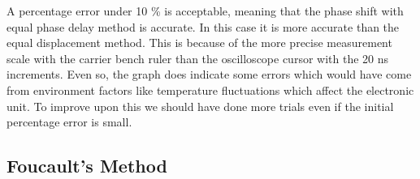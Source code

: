 \documentclass[12pt]{article}
\begin{document}
	A percentage error under 10 \% is acceptable, meaning that the phase shift with equal phase delay method is accurate. In this case it is more accurate than the equal displacement method. This is because of the more precise measurement scale with the carrier bench ruler than the oscilloscope cursor with the 20 ns increments. Even so, the graph does indicate some errors which would have come from environment factors like temperature fluctuations which affect the electronic unit. To improve upon this we should have done more trials even if the initial percentage error is small.
	
	
	\subsection{Foucault's Method}
	
\end{document}
